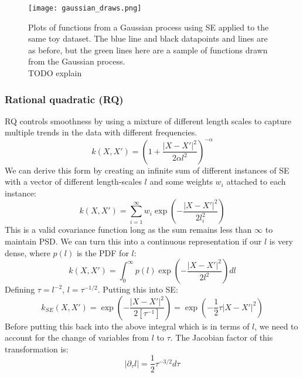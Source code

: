 \begin{figure}[H]
    \texttt{[image: gaussian\_draws.png]}
    \caption{
        Plots of functions from a Gaussian process using SE applied to the same toy dataset. The blue line and black datapoints and lines are as before, but the green lines here are a sample of functions drawn from the Gaussian process. \\
        TODO explain
    }
\end{figure}



\subsubsection{Rational quadratic (RQ)}
RQ controls smoothness by using a mixture of different length scales to capture multiple trends in the data with different frequencies. 
\begin{equation*}
    k(X,X') = \left( 1 + \frac{|X - X'|^2}{2\alpha l^2} \right)^{-\alpha}
\end{equation*}
We can derive this form by creating an infinite sum of different instances of SE with a vector of different length-scales $l$ and some weights $w_i$ attached to each instance:
\begin{equation*}
    k(X,X') = \sum_{i=1}^{\infty} w_i \exp \left( -\frac{|X - X'|^2}{2l_i^2} \right)
\end{equation*}
This is a valid covariance function long as the sum remains less than $\infty$ to maintain PSD. We can turn this into a continuous representation if our $l$ is very dense, where $p(l)$ is the PDF for $l$:
\begin{equation*}
    k(X,X') = \int_{0}^{\infty} p(l) \exp \left( -\frac{|X - X'|^2}{2l^2} \right) dl
\end{equation*}
Defining $\tau= l^{-2}$, $l = \tau^{-1/2}$. Putting this into SE:
\begin{equation*}
    k_{SE}(X,X') = \exp(-\frac{|X - X'|^2}{2[\tau^{-1}]}) = \exp(-\frac{1}{2} \tau |X - X'|^2)
\end{equation*}
Before putting this back into the above integral which is in terms of $l$, we need to account for the change of variables from $l$ to $\tau$. The Jacobian factor of this transformation is:
\begin{equation*}
    | \partial_{\tau} l | = \frac{1}{2} \tau^{-3/2} d\tau
\end{equation*}
